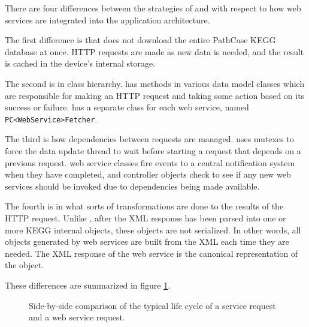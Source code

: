There are four differences between the strategies of \mawapp and \keggapp
with respect to how web services are integrated into the application
architecture.

The first difference is that \keggapp does not download the entire PathCase
KEGG database at once. HTTP requests are made as new data is needed, and the
result is cached in the device's internal storage.

The second is in class hierarchy. \mawapp has methods in various data model
classes which are responsible for making an HTTP request and taking some action
based on its success or failure. \keggapp has a separate class for each web
service, named \texttt{PC<WebService>Fetcher}.

The third is how dependencies between requests are managed. \mawapp uses
mutexes to force the data update thread to wait before starting a request that
depends on a previous request. \keggappp web service classes fire events to
a central notification system when they have completed, and controller objects
check to see if any new web services should be invoked due to dependencies being
made available.

The fourth is in what sorts of transformations are done to the results of the
HTTP request. Unlike \mawapp, after the XML response has been parsed into
one or more KEGG internal objects, these objects are not serialized. In other
words, all objects generated by web services are built from the XML each time
they are needed. The XML response of the web service is the canonical
representation of the object.

These differences are summarized in figure
\ref{fig:kegg_impl_web_service_differences}.

\begin{figure}[hbt]
    \caption{\label{fig:kegg_impl_web_service_differences} Side-by-side
    comparison of the typical life cycle of a \keggapp service request and a
    \mawapp web service request.}
\end{figure}


